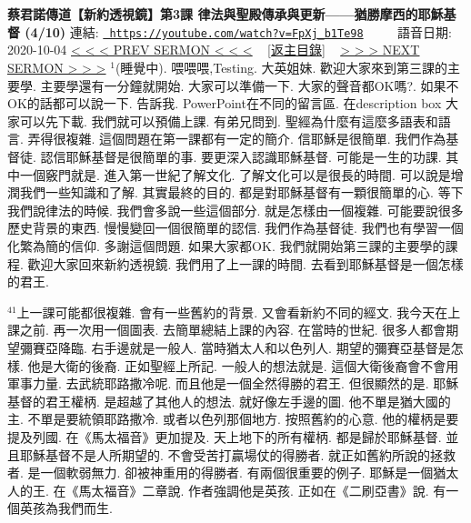 \documentclass{book}
\begin{document}
\section{}
\label{sec:FpXj_b1Te98}
\textbf{蔡君諾傳道【新約透視鏡】第3課  律法與聖殿傳承與更新——猶勝摩西的耶穌基督 (4/10)}
\newline
\newline
連結: \href{https://youtube.com/watch?v=FpXj_b1Te98}{\texttt{ https://youtube.com/watch?v=FpXj\_b1Te98}} ~~~~ 語音日期: 2020-10-04 
\newline
\newline
\hyperref[sec:meOlDsCMdvQ]{\small{< < < PREV SERMON < < <}}
~
\hyperref[sec:index]{\small{[返主目錄]}}
~
\hyperref[sec:PD1mkT7LGh4]{\small{> > > NEXT SERMON > > >}}
\newline
\newline
$^{1}$(睡覺中).
喂喂喂,Testing.
大英姐妹.
歡迎大家來到第三課的主要學.
主要學還有一分鐘就開始.
大家可以準備一下.
大家的聲音都OK嗎?.
如果不OK的話都可以說一下.
告訴我.
PowerPoint在不同的留言區.
在description box 大家可以先下載.
我們就可以預備上課.
有弟兄問到.
聖經為什麼有這麼多語表和語言.
弄得很複雜.
這個問題在第一課都有一定的簡介.
信耶穌是很簡單.
我們作為基督徒.
認信耶穌基督是很簡單的事.
要更深入認識耶穌基督.
可能是一生的功課.
其中一個竅門就是.
進入第一世紀了解文化.
了解文化可以是很長的時間.
可以說是增潤我們一些知識和了解.
其實最終的目的.
都是對耶穌基督有一顆很簡單的心.
等下我們說律法的時候.
我們會多說一些這個部分.
就是怎樣由一個複雜.
可能要說很多歷史背景的東西.
慢慢變回一個很簡單的認信.
我們作為基督徒.
我們也有學習一個化繁為簡的信仰.
多謝這個問題.
如果大家都OK.
我們就開始第三課的主要學的課程.
歡迎大家回來新約透視鏡.
我們用了上一課的時間.
去看到耶穌基督是一個怎樣的君王.

$^{41}$上一課可能都很複雜.
會有一些舊約的背景.
又會看新約不同的經文.
我今天在上課之前.
再一次用一個圖表.
去簡單總結上課的內容.
在當時的世紀.
很多人都會期望彌賽亞降臨.
右手邊就是一般人.
當時猶太人和以色列人.
期望的彌賽亞基督是怎樣.
他是大衛的後裔.
正如聖經上所記.
一般人的想法就是.
這個大衛後裔會不會用軍事力量.
去武統耶路撒冷呢.
而且他是一個全然得勝的君王.
但很顯然的是.
耶穌基督的君王權柄.
是超越了其他人的想法.
就好像左手邊的圖.
他不單是猶大國的主.
不單是要統領耶路撒冷.
或者以色列那個地方.
按照舊約的心意.
他的權柄是要提及列國.
在《馬太福音》更加提及.
天上地下的所有權柄.
都是歸於耶穌基督.
並且耶穌基督不是人所期望的.
不會受苦打贏場仗的得勝者.
就正如舊約所說的拯救者.
是一個軟弱無力.
卻被神重用的得勝者.
有兩個很重要的例子.
耶穌是一個猶太人的王.
在《馬太福音》二章說.
作者強調他是英孩.
正如在《二刷亞書》說.
有一個英孩為我們而生.
\end{document}
